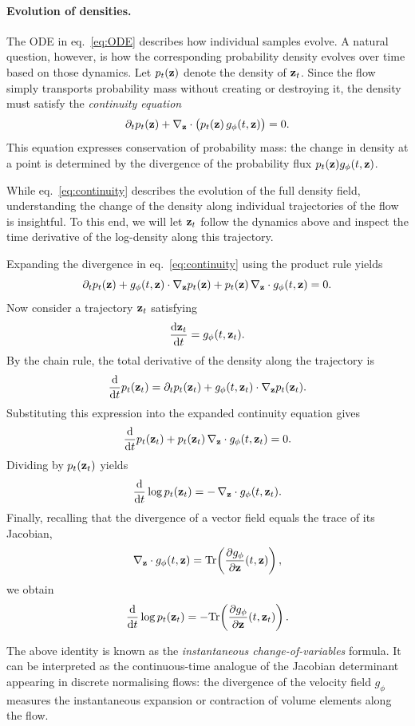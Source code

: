 \paragraph{Evolution of densities.}
The ODE in  eq.~\eqref{eq:ODE} describes how individual samples evolve. A natural question, however, is how the corresponding probability density evolves over time based on those dynamics. Let $p_t({ \mathbf{z}})$ denote the density of ${ \mathbf{z}}_t$. Since the flow
simply transports probability mass without creating or destroying it,
the density must satisfy the \emph{continuity equation} \cite[Ch.~5]{villani2009optimal}
\begin{equation}
\label{eq:continuity}
\partial_t p_t({ \mathbf{z}})
+
\nabla_{ \mathbf{z}} \cdot \big(p_t({ \mathbf{z}})\, g_\phi(t,{ \mathbf{z}})\big)
=
0.
\end{equation}
This equation expresses conservation of probability mass: the change in
density at a point is determined by the divergence of the probability
flux $p_t({ \mathbf{z}}) g_\phi(t,{ \mathbf{z}})$.

While eq.~\eqref{eq:continuity} describes the evolution of the full density field, understanding the change of the density along individual trajectories of the flow is insightful. To this end, we will let ${ \mathbf{z}}_t$ follow the dynamics above and inspect the time derivative of the log-density along this trajectory.

Expanding the divergence in eq.~\eqref{eq:continuity} using the product
rule yields
\[
\partial_t p_t({ \mathbf{z}})
+
g_\phi(t,{ \mathbf{z}})\cdot\nabla_{ \mathbf{z}} p_t({ \mathbf{z}})
+
p_t({ \mathbf{z}})\,\nabla_{ \mathbf{z}}\cdot g_\phi(t,{ \mathbf{z}})
=
0.
\]
Now consider a trajectory ${ \mathbf{z}}_t$ satisfying
\[
\frac{{\text{d}} { \mathbf{z}}_t}{{\text{d}} t} = g_\phi(t,{ \mathbf{z}}_t).
\]
By the chain rule, the total derivative of the density along the
trajectory is
\[
\frac{{\text{d}}}{{\text{d}} t} p_t({ \mathbf{z}}_t)
=
\partial_t p_t({ \mathbf{z}}_t)
+
g_\phi(t,{ \mathbf{z}}_t)\cdot\nabla_{ \mathbf{z}} p_t({ \mathbf{z}}_t).
\]
Substituting this expression into the expanded continuity equation
gives
\[
\frac{{\text{d}}}{{\text{d}} t} p_t({ \mathbf{z}}_t)
+
p_t({ \mathbf{z}}_t)\,\nabla_{ \mathbf{z}}\cdot g_\phi(t,{ \mathbf{z}}_t)
=
0.
\]
Dividing by $p_t({ \mathbf{z}}_t)$ yields
\[
\frac{{\text{d}}}{{\text{d}} t} \log p_t({ \mathbf{z}}_t)
=
-\,\nabla_{ \mathbf{z}}\cdot g_\phi(t,{ \mathbf{z}}_t).
\]
Finally, recalling that the divergence of a vector field equals the
trace of its Jacobian,
\[
\nabla_{ \mathbf{z}}\cdot g_\phi(t,{ \mathbf{z}})
=
\mathrm{Tr}\!\left(
\frac{\partial g_\phi}{\partial { \mathbf{z}}}(t,{ \mathbf{z}})
\right),
\]
we obtain
\[
\frac{{\text{d}}}{{\text{d}} t} \log p_t({ \mathbf{z}}_t)
=
- \mathrm{Tr}\!\left(
\frac{\partial g_\phi}{\partial { \mathbf{z}}}(t,{ \mathbf{z}}_t)
\right).
\]

\begin{remark}
The above identity is known as the \emph{instantaneous change-of-variables} formula. It can be interpreted as the continuous-time analogue of the Jacobian determinant appearing in discrete normalising flows: the divergence of the velocity field $g_\phi$ measures the instantaneous expansion or contraction of volume elements along the flow.
\end{remark}
 


